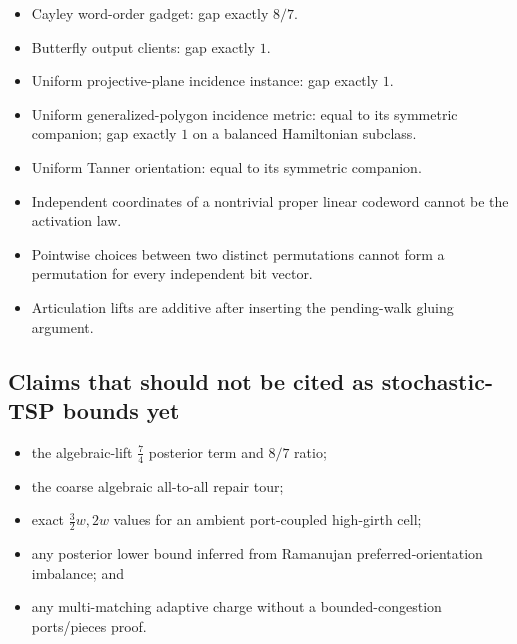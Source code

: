 \documentclass[11pt,a4paper]{article}
\begin{document}
\begin{itemize}

\item Cayley word-order gadget: gap exactly \(8/7\).

\item Butterfly output clients: gap exactly \(1\).

\item Uniform projective-plane incidence instance: gap exactly \(1\).

\item Uniform generalized-polygon incidence metric: equal to its symmetric companion; gap exactly \(1\) on a balanced Hamiltonian subclass.

\item Uniform Tanner orientation: equal to its symmetric companion.

\item Independent coordinates of a nontrivial proper linear codeword cannot be the activation law.

\item Pointwise choices between two distinct permutations cannot form a permutation for every independent bit vector.

\item Articulation lifts are additive after inserting the pending-walk gluing argument.

\end{itemize}

\subsection*{Claims that should not be cited as stochastic-TSP bounds yet}

\begin{itemize}

\item the algebraic-lift \(\tfrac74\) posterior term and \(8/7\) ratio;

\item the coarse algebraic all-to-all repair tour;

\item exact \(\tfrac32w,2w\) values for an ambient port-coupled high-girth cell;

\item any posterior lower bound inferred from Ramanujan preferred-orientation imbalance; and

\item any multi-matching adaptive charge without a bounded-congestion ports/pieces proof.

\end{itemize}
\end{document}
